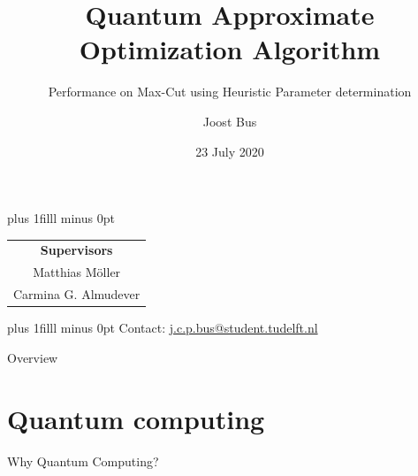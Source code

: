 \documentclass{beamer}
\title[]{Quantum Approximate Optimization Algorithm}
\subtitle{Performance on Max-Cut using Heuristic Parameter determination}
\institute[]{Delft University of Technology, the Netherlands}
\author{Joost Bus}
\date{23 July 2020}
\def\vfilll{\vskip 0pt plus 1filll minus 0pt }
\begin{document}
{
\begin{frame}
\vfilll
\titlepage
\footnotesize
\centering
\begin{tabular}{c}
	\textbf{Supervisors} \\
	Matthias M\"{o}ller \\
	Carmina G. Almudever
\end{tabular}%
\vfilll
\tiny{Contact: \url{j.c.p.bus@student.tudelft.nl}}
\end{frame}
{}

\begin{frame}{Overview}
\tableofcontents
\end{frame}

\section{Quantum computing}
\begin{frame}{Why Quantum Computing?}


\end{frame}}
\end{document}
